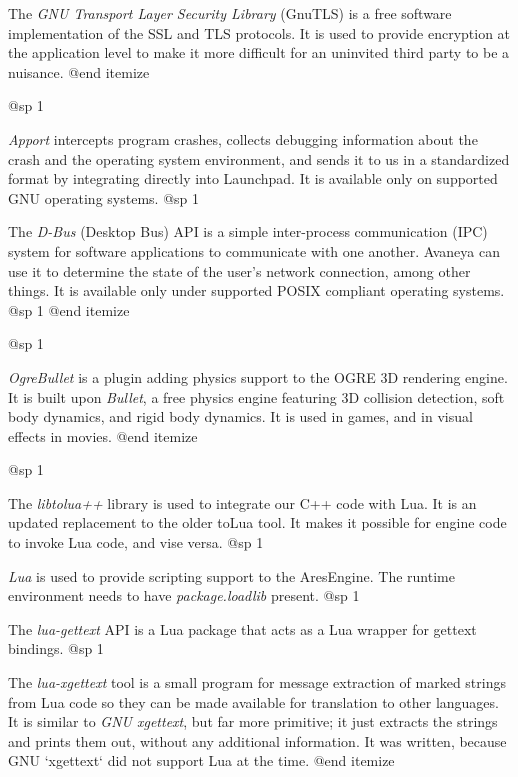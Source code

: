 \item
The {\it GNU Transport Layer Security Library} (GnuTLS) is a free software implementation of the SSL and TLS protocols. It is used to provide encryption at the application level to make it more difficult for an uninvited third party to be a nuisance.
@end itemize

@sp 1

\itemize
\item
{\it Apport} intercepts program crashes, collects debugging information about the crash and the operating system environment, and sends it to us in a standardized format by integrating directly into Launchpad. It is available only on supported GNU operating systems.
@sp 1

\item
The {\it D-Bus} (Desktop Bus) API is a simple inter-process communication (IPC) system for software applications to communicate with one another. Avaneya can use it to determine the state of the user's network connection, among other things. It is available only under supported POSIX compliant operating systems.
@sp 1
@end itemize

@sp 1

\itemize
\item
{\it OgreBullet} is a plugin adding physics support to the OGRE 3D rendering engine. It is built upon {\it Bullet}, a free physics engine featuring 3D collision detection, soft body dynamics, and rigid body dynamics. It is used in games, and in visual effects in movies.
@end itemize


@sp 1

\itemize

\item
The {\it libtolua++} library is used to integrate our C++ code with Lua. It is an updated replacement to the older toLua tool. It makes it possible for engine code to invoke Lua code, and vise versa.
@sp 1

\item
{\it Lua} is used to provide scripting support to the AresEngine. The runtime environment needs to have {\it package.loadlib} present.
@sp 1

\item
The {\it lua-gettext} API is a Lua package that acts as a Lua wrapper for gettext bindings.
@sp 1

\item
The {\it lua-xgettext} tool is a small program for message extraction of marked strings from Lua code so they can be made available for translation to other languages. It is similar to {\it GNU xgettext}, but far more primitive; it just extracts the strings and prints them out, without any additional information. It was written, because GNU `xgettext` did not support Lua at the time.
@end itemize


